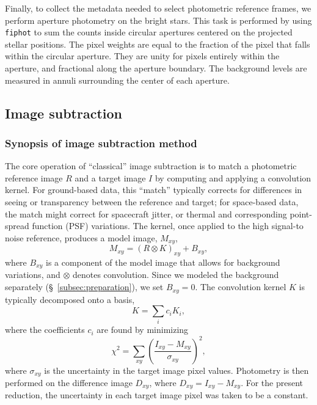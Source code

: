 \documentclass[12pt,twocolumn,tighten]{aastex62}
\begin{document}
Finally, to collect the metadata needed to select photometric
reference frames, we perform aperture photometry on the bright stars.
This task is performed by using \texttt{fiphot} to sum the counts
inside circular apertures centered on the projected stellar positions.
The pixel weights are equal to the fraction of the pixel that falls
within the circular aperture.  They are unity for pixels entirely
within the aperture, and fractional along the aperture boundary.  The
background levels are measured in annuli surrounding the center of
each aperture. 


\subsection{Image subtraction}
\label{subsec:imagesubtraction}

\subsubsection{Synopsis of image subtraction method}

The core operation of ``classical'' image subtraction is to match a
photometric reference image $R$ and a target image $I$ by computing
and applying a convolution kernel.  For ground-based data, this
``match'' typically corrects for differences in seeing or transparency
between the reference and target; for space-based data, the match
might correct for spacecraft jitter, or thermal and corresponding
point-spread function (PSF) variations.  The kernel, once applied to
the high signal-to noise reference, produces a model image, $M_{xy}$,
\begin{equation}
    M_{xy} = (R \otimes K)_{xy} + B_{xy},
    \label{eq:imagemodel}
\end{equation}
where $B_{xy}$ is a component of the model image that allows for
background variations, and $\otimes$ denotes convolution.  Since we
modeled the background separately (\S~\ref{subsec:preparation}), we
set $B_{xy}=0$.  The convolution kernel $K$ is typically decomposed
onto a basis,
\begin{equation}
K = \sum_i c_i K_i,
\end{equation}
where the coefficients $c_i$ are found by minimizing
\begin{equation}
    \chi^2 = \sum_{xy} \left( \frac{I_{xy} - M_{xy}}{\sigma_{xy}} \right)^2,
    \label{eq:chisq_conv}
\end{equation}
where $\sigma_{xy}$ is the uncertainty in the target image pixel
values.  Photometry is then performed on the difference image
$D_{xy}$, where $D_{xy} = I_{xy} - M_{xy}$.  For the present
reduction, the uncertainty in each target image pixel was taken to be
a constant.	
\end{document}

